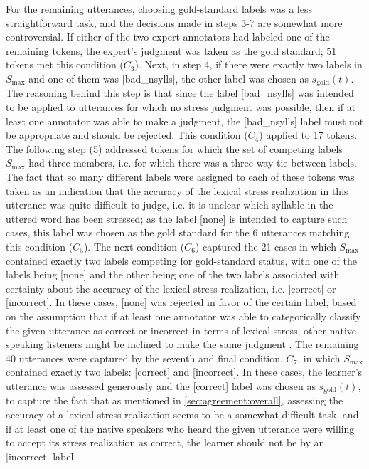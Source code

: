 		For the remaining 
		utterances, choosing gold-standard labels was a less straightforward task,
		and the decisions made in steps 3-7 are somewhat more controversial.
		If either of the two expert annotators had labeled one of the remaining tokens, the expert's judgment was taken as the gold standard; 51 tokens met this condition ($C_3$). 
		Next, in step 4, if there were exactly two labels in $S_{\text{max}}$ and one of them was [bad\_nsylls], the other label was chosen as $s_{\text{gold}}(t)$. The reasoning behind this step is that since the label [bad\_nsylls] was intended to be applied to utterances for which no stress judgment was possible, then if at least one annotator was able to make a judgment, the [bad\_nsylls] label must not be appropriate and should be rejected. This condition ($C_4$) applied to 17 tokens. 
		The following step (5) addressed tokens for which the set of competing labels $S_{\text{max}}$ had three members, i.e. for which there was a three-way tie between labels. The fact that so many different labels were assigned to each of these tokens was taken as an indication that the accuracy of the lexical stress realization in this utterance was quite difficult to judge, i.e. it is unclear which syllable in the uttered word has been stressed; as the label [none] is intended to capture such cases, this label was chosen as the gold standard for the 6 utterances matching this condition ($C_5$).
		The next condition ($C_6$) captured the 21 cases in which $S_{\text{max}}$ contained exactly two labels competing for gold-standard status, with one of the labels being [none] and the other being one of the two labels associated with certainty about the accuracy of the lexical stress realization, i.e. [correct] or [incorrect]. In these cases, [none] was rejected in favor of the certain label, based on the assumption that if at least one annotator was able to categorically classify the given utterance as correct or incorrect in terms of lexical stress, other native-speaking listeners might be inclined to make the same judgment .
		The remaining 40 utterances were captured by the seventh and final condition, $C_7$, in which $S_{\text{max}}$ contained exactly two labels: [correct] and [incorrect]. In these cases, the learner's utterance was assessed generously and the [correct] label was chosen as $s_{\text{gold}}(t)$, to capture the fact that as mentioned in \cref{sec:agreement:overall}, assessing the accuracy of a lexical stress realization seems to be a somewhat difficult task, and if at least one of the native speakers who heard the given utterance were willing to accept its stress realization as correct, the learner should not be  by an [incorrect] label.
		
